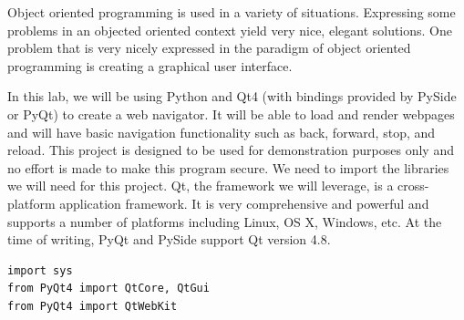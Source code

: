 
Object oriented programming is used in a variety of situations.
Expressing some problems in an objected oriented context yield very nice, elegant solutions.
One problem that is very nicely expressed in the paradigm of object oriented programming is creating a graphical user interface.

In this lab, we will be using Python and Qt4 (with bindings provided by PySide or PyQt) to create a web navigator.
It will be able to load and render webpages and will have basic navigation functionality such as back, forward, stop, and reload.
This project is designed to be used for demonstration purposes only and no effort is made to make this program secure.
We need to import the libraries we will need for this project.
Qt, the framework we will leverage, is a cross-platform application framework.
It is very comprehensive and powerful and supports a number of platforms including Linux, OS X, Windows, etc.
At the time of writing, PyQt and PySide support Qt version 4.8.
\begin{lstlisting}
import sys
from PyQt4 import QtCore, QtGui
from PyQt4 import QtWebKit
\end{lstlisting}

